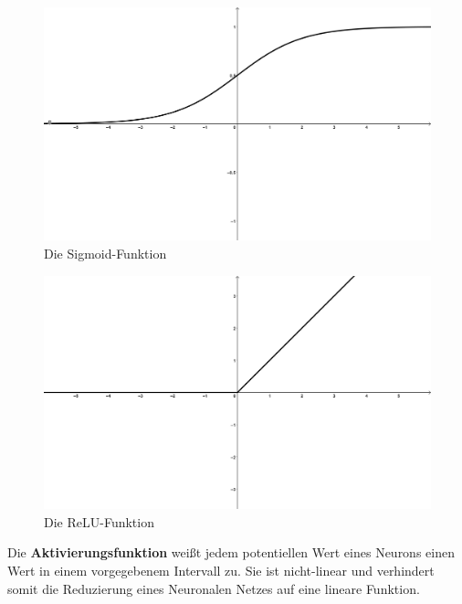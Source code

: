 \begin{figure}
    \centering
    \includegraphics[width=\textwidth]{zeichnungen/sigmoid.png}
    \caption{Die Sigmoid-Funktion}\label{img:sigmoid}
\end{figure}

\begin{figure}
    \centering
    \includegraphics[width=\textwidth]{zeichnungen/relu.png}
    \caption{Die ReLU-Funktion}\label{img:relu}
\end{figure}

\begin{definition}\label{def:aktivierungsfunktion}
    Die \textbf{Aktivierungsfunktion} weißt jedem potentiellen Wert eines Neurons einen Wert in einem vorgegebenem Intervall zu.
    Sie ist nicht-linear und verhindert somit die Reduzierung eines Neuronalen Netzes auf eine lineare Funktion.
\end{definition}

